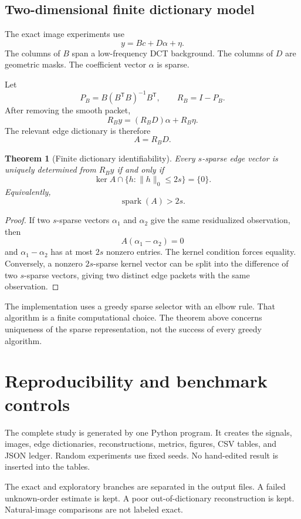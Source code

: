 \documentclass[11pt,oneside,openany]{book}
\newtheorem{theorem}{Theorem}[chapter]
\theoremstyle{definition}
\theoremstyle{remark}
\newcommand{\spark}{\operatorname{spark}}
\begin{document}
\section{Two-dimensional finite dictionary model}

The exact image experiments use
\[
y=Bc+D\alpha+\eta.
\]
The columns of $B$ span a low-frequency DCT background. The columns of $D$ are geometric masks. The coefficient vector $\alpha$ is sparse.

Let
\[
P_B=B(B^\mathsf TB)^{-1}B^\mathsf T,
\qquad
R_B=I-P_B.
\]
After removing the smooth packet,
\[
R_By=(R_BD)\alpha+R_B\eta.
\]
The relevant edge dictionary is therefore
\[
A=R_BD.
\]

\begin{theorem}[Finite dictionary identifiability]
Every $s$-sparse edge vector is uniquely determined from $R_By$ if and only if
\[
\ker A\cap\{h:\|h\|_0\le 2s\}=\{0\}.
\]
Equivalently,
\[
\spark(A)>2s.
\]
\end{theorem}

\begin{proof}
If two $s$-sparse vectors $\alpha_1$ and $\alpha_2$ give the same residualized observation, then
\[
A(\alpha_1-\alpha_2)=0
\]
and $\alpha_1-\alpha_2$ has at most $2s$ nonzero entries. The kernel condition forces equality. Conversely, a nonzero $2s$-sparse kernel vector can be split into the difference of two $s$-sparse vectors, giving two distinct edge packets with the same observation.
\end{proof}

The implementation uses a greedy sparse selector with an elbow rule. That algorithm is a finite computational choice. The theorem above concerns uniqueness of the sparse representation, not the success of every greedy algorithm.

\chapter{Reproducibility and benchmark controls}

The complete study is generated by one Python program. It creates the signals, images, edge dictionaries, reconstructions, metrics, figures, CSV tables, and JSON ledger. Random experiments use fixed seeds. No hand-edited result is inserted into the tables.

The exact and exploratory branches are separated in the output files. A failed unknown-order estimate is kept. A poor out-of-dictionary reconstruction is kept. Natural-image comparisons are not labeled exact.
\end{document}

